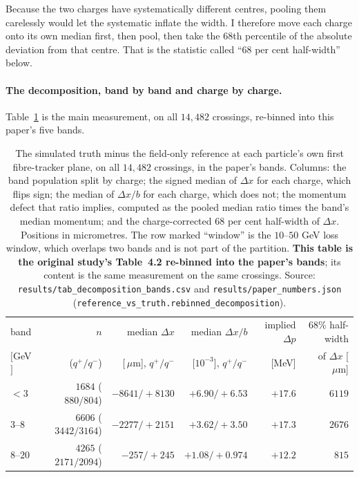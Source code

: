 \documentclass[11pt,a4paper]{article}
\newcommand{\um}{\ensuremath{\,\mu\mathrm{m}}}
\begin{document}
Because the two charges have systematically different centres, pooling them
carelessly would let the systematic inflate the width. I therefore move each
charge onto its own median first, then pool, then take the $68$th percentile of
the absolute deviation from that centre. That is the statistic called ``$68$ per
cent half-width'' below.

\paragraph{The decomposition, band by band and charge by charge.}
Table~\ref{tab:decomp} is the main measurement, on all $14{,}482$ crossings,
re-binned into this paper's five bands.

\begin{table}[tbp]
  \centering
  \caption{The simulated truth minus the field-only reference at each particle's
  own first fibre-tracker plane, on all $14{,}482$ crossings, in the paper's
  bands. Columns: the band population split by charge; the signed median of
  $\Delta x$ for each charge, which flips sign; the median of $\Delta x / b$ for
  each charge, which does not; the momentum defect that ratio implies, computed
  as the pooled median ratio times the band's median momentum; and the
  charge-corrected $68$ per cent half-width of $\Delta x$. Positions in
  micrometres. The row marked ``window'' is the $10$--$50$ GeV loss window, which overlaps two bands and is not part of the partition. \textbf{This table is
  the original study's Table~4.2 re-binned into the paper's bands}; its content
  is the same measurement on the same crossings.
  Source: \texttt{results/tab\_decomposition\_bands.csv} and
  \texttt{results/paper\_numbers.json} (\texttt{reference\_vs\_truth.rebinned\_decomposition}).}
  \label{tab:decomp}
  \footnotesize
  \setlength{\tabcolsep}{4pt}
  \begin{tabular}{lrrrrr}
    \toprule
    band & $n$ & median $\Delta x$ & median $\Delta x / b$ & implied $\Delta p$ & $68\%$ half-width \\
    $[$GeV$]$ & ($q^{+}/q^{-}$) & [\um], $q^{+}/q^{-}$ & [$10^{-3}$], $q^{+}/q^{-}$ & [MeV] & of $\Delta x$ [\um] \\
    \midrule
    $<3$       & $1684$ ($880/804$)     & $-8641 / +8130$ & $+6.90 / +6.53$   & $+17.6$ & $6119$ \\
    $3$--$8$   & $6606$ ($3442/3164$)   & $-2277 / +2151$ & $+3.62 / +3.50$   & $+17.3$ & $2676$ \\
    $8$--$20$  & $4265$ ($2171/2094$)   & $-257 / +245$   & $+1.08 / +0.974$  & $+12.2$ & $815$ \\

\end{tabular}
\end{table}
\end{document}

